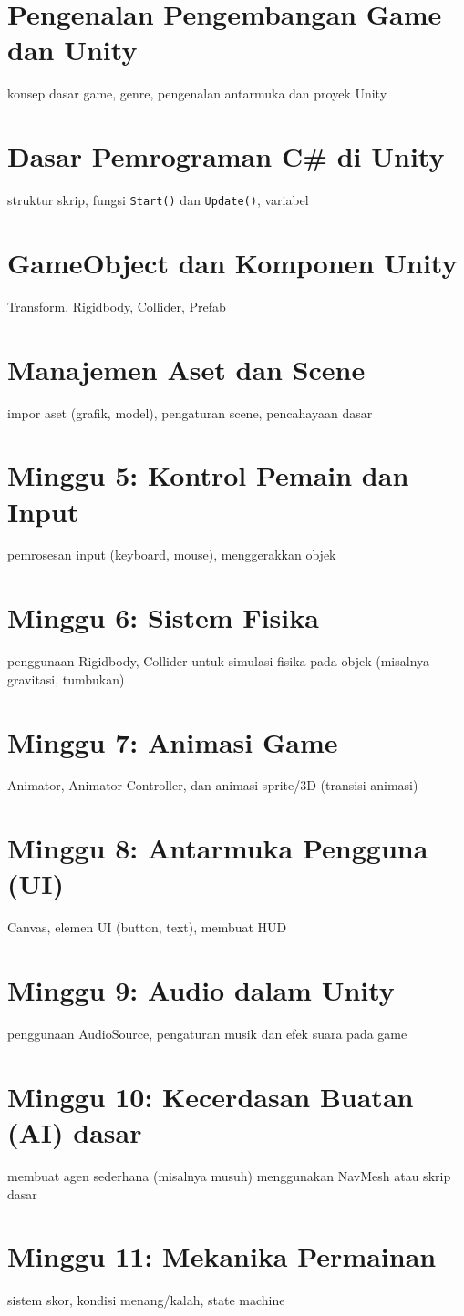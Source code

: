 \documentclass[a4paper]{article}
\begin{document}
\section*{Pengenalan Pengembangan Game dan Unity}
konsep dasar game, genre, pengenalan antarmuka dan proyek Unity

\section*{Dasar Pemrograman C\# di Unity}
struktur skrip, fungsi \texttt{Start()} dan \texttt{Update()}, variabel

\section*{GameObject dan Komponen Unity}
Transform, Rigidbody, Collider, Prefab

\section*{Manajemen Aset dan Scene}
impor aset (grafik, model), pengaturan scene, pencahayaan dasar

\section*{Minggu 5: Kontrol Pemain dan Input}
pemrosesan input (keyboard, mouse), menggerakkan objek

\section*{Minggu 6: Sistem Fisika}
penggunaan Rigidbody, Collider untuk simulasi fisika pada objek (misalnya gravitasi, tumbukan)

\section*{Minggu 7: Animasi Game}
Animator, Animator Controller, dan animasi sprite/3D (transisi animasi)

\section*{Minggu 8: Antarmuka Pengguna (UI)}
Canvas, elemen UI (button, text), membuat HUD

\section*{Minggu 9: Audio dalam Unity}
penggunaan AudioSource, pengaturan musik dan efek suara pada game

\section*{Minggu 10: Kecerdasan Buatan (AI) dasar}
membuat agen sederhana (misalnya musuh) menggunakan NavMesh atau skrip dasar

\section*{Minggu 11: Mekanika Permainan}
sistem skor, kondisi menang/kalah, state machine
\end{document}

